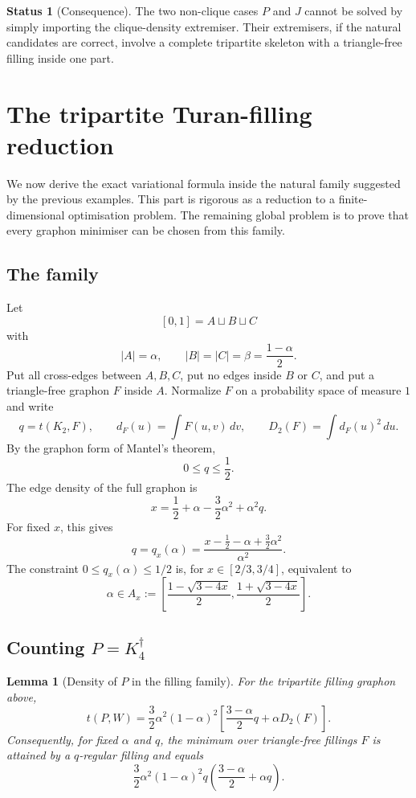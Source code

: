 \documentclass[11pt]{amsart}
\newtheorem{lemma}[theorem]{Lemma}
\theoremstyle{definition}
\newtheorem{status}[theorem]{Status}
\newcommand{\1}{\mathbf 1}
\newcommand{\dd}{\,d}
\begin{document}
\begin{status}[Consequence]
The two non-clique cases $P$ and $J$ cannot be solved by simply importing the clique-density extremiser.  Their extremisers, if the natural candidates are correct, involve a complete tripartite skeleton with a triangle-free filling inside one part.
\end{status}

\section{The tripartite Turan-filling reduction}

We now derive the exact variational formula inside the natural family suggested by the previous examples.  This part is rigorous as a reduction to a finite-dimensional optimisation problem.  The remaining global problem is to prove that every graphon minimiser can be chosen from this family.

\subsection{The family}

Let
\[
   [0,1]=A\sqcup B\sqcup C
\]
with
\[
   |A|=\alpha,
   \qquad |B|=|C|=\beta=\frac{1-\alpha}{2}.
\]
Put all cross-edges between $A,B,C$, put no edges inside $B$ or $C$, and put a triangle-free graphon $F$ inside $A$.  Normalize $F$ on a probability space of measure $1$ and write
\[
   q=t(K_2,F),
   \qquad d_F(u)=\int F(u,v)\dd v,
   \qquad D_2(F)=\int d_F(u)^2\dd u.
\]
By the graphon form of Mantel's theorem,
\[
   0\le q\le \frac12.
\]
The edge density of the full graphon is
\[
   x=\frac12+\alpha-\frac32\alpha^2+\alpha^2q.
\]
For fixed $x$, this gives
\[
   q=q_x(\alpha)=\frac{x-\frac12-\alpha+\frac32\alpha^2}{\alpha^2}.
\]
The constraint $0\le q_x(\alpha)\le 1/2$ is, for $x\in[2/3,3/4]$, equivalent to
\[
   \alpha\in A_x:=\left[
      \frac{1-\sqrt{3-4x}}2,
      \frac{1+\sqrt{3-4x}}2
   \right].
\]

\subsection{Counting $P=K_4^\dagger$}

\begin{lemma}[Density of $P$ in the filling family]
For the tripartite filling graphon above,
\[
   t(P,W)=\frac32\alpha^2(1-\alpha)^2
          \left[
             \frac{3-\alpha}{2}q+\alpha D_2(F)
          \right].
\]
Consequently, for fixed $\alpha$ and $q$, the minimum over triangle-free fillings $F$ is attained by a $q$-regular filling and equals
\[
   \frac32\alpha^2(1-\alpha)^2q
          \left(\frac{3-\alpha}{2}+\alpha q\right).
\]
\end{lemma}
\end{document}
